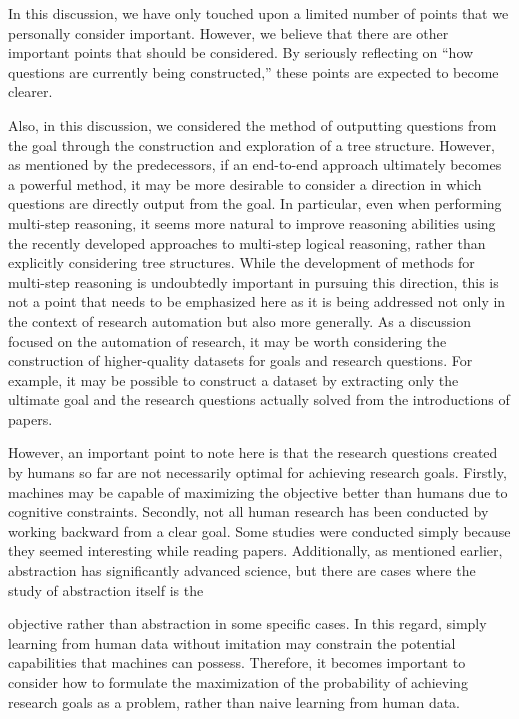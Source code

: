\documentclass{book}
\begin{document}
In this discussion, we have only touched upon a limited number of points that we personally consider important. However, we believe that there are other important points that should be considered. By seriously reflecting on ``how questions are currently being constructed,'' these points are expected to become clearer.

Also, in this discussion, we considered the method of outputting questions from the goal through the construction and exploration of a tree structure. However, as mentioned by the predecessors, if an end-to-end approach ultimately becomes a powerful method, it may be more desirable to consider a direction in which questions are directly output from the goal. In particular, even when performing multi-step reasoning, it seems more natural to improve reasoning abilities using the recently developed approaches to multi-step logical reasoning, rather than explicitly considering tree structures. While the development of methods for multi-step reasoning is undoubtedly important in pursuing this direction, this is not a point that needs to be emphasized here as it is being addressed not only in the context of research automation but also more generally. As a discussion focused on the automation of research, it may be worth considering the construction of higher-quality datasets for goals and research questions. For example, it may be possible to construct a dataset by extracting only the ultimate goal and the research questions actually solved from the introductions of papers.

However, an important point to note here is that the research questions created by humans so far are not necessarily optimal for achieving research goals. Firstly, machines may be capable of maximizing the objective better than humans due to cognitive constraints. Secondly, not all human research has been conducted by working backward from a clear goal. Some studies were conducted simply because they seemed interesting while reading papers. Additionally, as mentioned earlier, abstraction has significantly advanced science, but there are cases where the study of abstraction itself is the

 objective rather than abstraction in some specific cases. In this regard, simply learning from human data without imitation may constrain the potential capabilities that machines can possess. Therefore, it becomes important to consider how to formulate the maximization of the probability of achieving research goals as a problem, rather than naive learning from human data.
\end{document}
